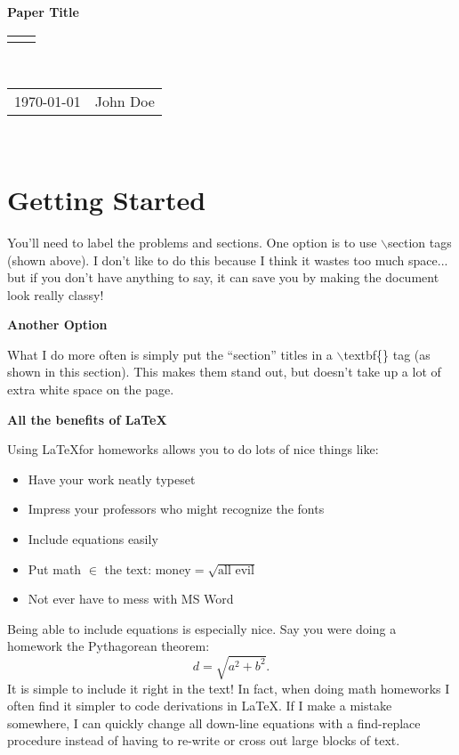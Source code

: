 \documentclass[12pt]{article}
\renewcommand{\title}[1]{\textbf{#1}\\}
\renewcommand{\line}{\begin{tabularx}{\textwidth}{X>{\raggedleft}X}\hline\\\end{tabularx}\\[-0.5cm]}
\newcommand{\leftright}[2]{\begin{tabularx}{\textwidth}{X>{\raggedleft}X}#1%
& #2\\\end{tabularx}\\[-0.5cm]}
\begin{document}
\title{Paper Title}
\line
\leftright{\today}{John Doe} %

\section{Getting Started}

You'll need to label the problems and sections.  One option is to use
$\backslash$section tags (shown above).  I don't like to do this because I
think it wastes too much space... but if you don't have anything to say, it
can save you by making the document look really classy!

\textbf{Another Option}

What I do more often is simply put the ``section'' titles in a
$\backslash$textbf\{\} tag (as shown in this section).  This makes them stand
out, but doesn't take up a lot of extra white space on the page.

\textbf{All the benefits of \LaTeX}

Using \LaTeX for homeworks allows you to do lots of nice things like:
\begin{itemize}
\item Have your work neatly typeset
\item Impress your professors who might recognize the fonts
\item Include equations easily
\item Put math $\in$ the text: $\textrm{money} = \sqrt{\textrm{all evil}}$
\item Not ever have to mess with MS Word
\end{itemize}

Being able to include equations is especially nice.  Say you were doing a
homework the Pythagorean theorem:
\begin{equation}
d = \sqrt{a^2+b^2}.
\end{equation}
It is simple to include it right in the text!  In fact, when doing math
homeworks I often find it simpler to code derivations in \LaTeX.  If I make a
mistake somewhere, I can quickly change all down-line equations with a
find-replace procedure instead of having to re-write or cross out large blocks
of text.
\end{document}
